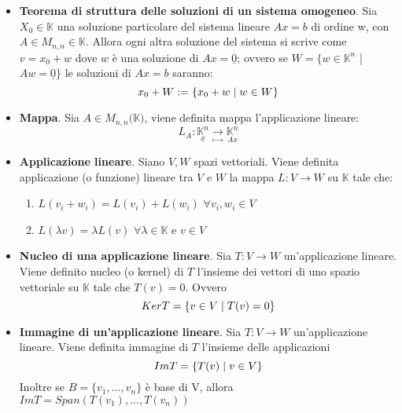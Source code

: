 \documentclass[12pt,a4paper,oneside]{book}
\begin{document}
\begin{itemize}

\item \textbf{Teorema di struttura delle soluzioni di un sistema omogeneo}. \linebreak
	  Sia $X_0\in\mathbb{K}$ una soluzione particolare del sistema lineare $Ax=b$ di ordine w, con
	  $A\in M_{n, n}\in\mathbb{K}$.
	  Allora ogni altra soluzione del sistema si scrive come $v=x_0+w$ dove $w$ è una soluzione di $Ax
	  = \underline{0}$; ovvero se $W=\{w\in\mathbb{K}^n$ | $Aw=\underline{0}\}$ le soluzioni di $Ax=b$
	  saranno: \linebreak
	  $$x_0+W:=\{x_0+w\hspace{0.1cm} |\hspace{0.1cm} w\in W\}$$
	
\item \textbf{Mappa}. \linebreak
	  Sia $A\in M_{n,n}(\mathbb{K)}$, viene definita mappa l'applicazione lineare: \hfill \break
	  $$L_A : \underset{\underline{x}}{\mathbb{K}^n} \underset{\longmapsto}{\rightarrow}
	  \underset{Ax}{\mathbb{K}^n}$$
	
\item \textbf{Applicazione lineare}. \linebreak
	  Siano $V, W$ spazi vettoriali. Viene definita applicazione (o funzione) lineare tra $V$ e $W$
	  la mappa $L:V\rightarrow W$ su $\mathbb{K}$ tale che:
	  
	  \begin{enumerate}
	  \item $L(v_i+w_i) = L(v_i) + L(w_i)$\hspace{0.5cm} $\forall v_i, w_i \in V$
	  \item $L(\lambda v) = \lambda L(v)$\hspace{0.5cm} $\forall \lambda \in \mathbb{K}$ e $v\in V$
	  \end{enumerate}
	
\item \textbf{Nucleo di una applicazione lineare}. \linebreak
	  Sia $T:V\rightarrow W$ un'applicazione lineare. Viene definito nucleo (o kernel) di $T$ l'insieme
	  dei vettori di uno spazio vettoriale su $\mathbb{K}$ tale che $T(v)=0$. Ovvero
	  $$Ker T=\{v\in V\hspace{0.1cm} |\hspace{0.1cm} T(v)=0\}$$
	
\item \textbf{Immagine di un'applicazione lineare}. \linebreak
	  Sia $T:V\rightarrow W$ un'applicazione lineare. Viene definita immagine di $T$ l'insieme
	  delle applicazioni
	  $$Im T=\{T(v)\hspace{0.1cm} |\hspace{0.1cm} v\in V\}$$ \hfill \break
	  \linebreak
	  Inoltre se $B=\{v_1, ..., v_n\}$ è base di V, allora $ImT =Span(T(v_1), ..., T(v_n))$
	

\end{itemize}
\end{document}
